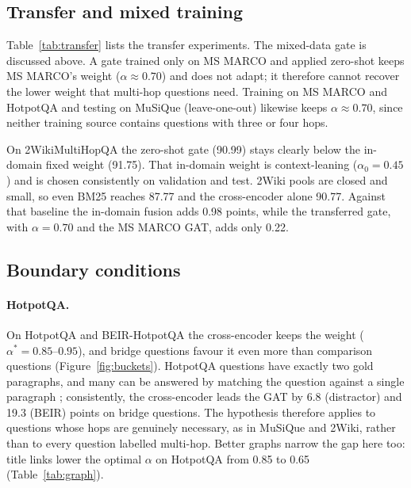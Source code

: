 \documentclass[11pt]{article}
\begin{document}
\subsection{Transfer and mixed training}
\label{sec:transfer}


Table~\ref{tab:transfer} lists the transfer experiments. The mixed-data gate is discussed above. A
gate trained only on MS MARCO and applied zero-shot keeps MS MARCO's weight ($\alpha\approx0.70$) and
does not adapt; it therefore cannot recover the lower weight that multi-hop questions need. Training on
MS MARCO and HotpotQA and testing on MuSiQue (leave-one-out) likewise keeps $\alpha\approx0.70$, since
neither training source contains questions with three or four hops.

On 2WikiMultiHopQA the zero-shot gate (90.99) stays clearly below the in-domain fixed weight (91.75). That
in-domain weight is context-leaning ($\alpha_0=0.45$) and is chosen consistently on validation and test.
2Wiki pools are closed and small, so even BM25 reaches 87.77 and the cross-encoder alone 90.77.
Against that baseline the in-domain fusion adds 0.98 points, while the transferred gate, with
$\alpha=0.70$ and the MS MARCO GAT, adds only 0.22.

\subsection{Boundary conditions}
\label{sec:boundary}

\paragraph{HotpotQA.} On HotpotQA and BEIR-HotpotQA the cross-encoder keeps the weight
($\alpha^*=0.85$--$0.95$), and bridge questions favour it even more than comparison questions
(Figure~\ref{fig:buckets}). HotpotQA questions have exactly two gold paragraphs, and many can be answered
by matching the question against a single paragraph \citep{min2019compositional}; consistently, the
cross-encoder leads the GAT by 6.8 (distractor) and 19.3 (BEIR) points on bridge questions. The
hypothesis therefore applies to questions whose hops are genuinely necessary, as in MuSiQue and 2Wiki,
rather than to every question labelled multi-hop. Better graphs narrow the gap here too: title links lower
the optimal $\alpha$ on HotpotQA from 0.85 to 0.65 (Table~\ref{tab:graph}).
\end{document}
